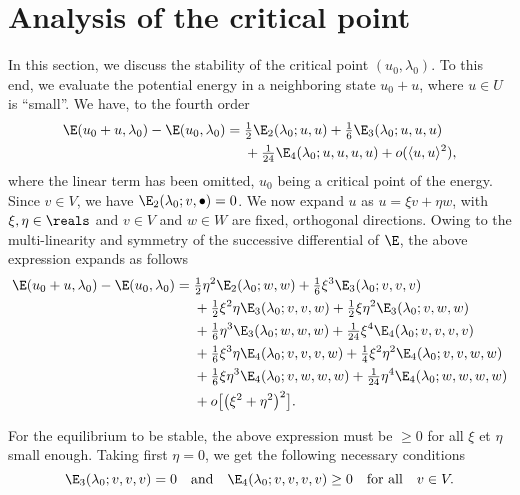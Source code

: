 \section{Analysis of the critical point}
\label{sec:20220802061621}

In this section, we discuss the stability of the critical point $(u_0, \lambda_0)$. To this end, we evaluate the
potential energy in a neighboring state $u_0 + u$, where $u \in U$ is ``small''. We have, to the fourth order
\begin{equation}
  \begin{aligned}[b]
    \E(u_0 + u, \lambda_0) - \E(u_0, \lambda_0) ={}
    &\tfrac{1}{2} \E_2(\lambda_0; u, u) + \tfrac{1}{6} \E_3(\lambda_0; u, u, u)\\
    &+ \tfrac{1}{24} \E_4(\lambda_0; u, u, u, u) + o(\langle u , u \rangle^2),
  \end{aligned}
\end{equation}
where the linear term has been omitted, $u_0$ being a critical point of the energy. Since $v \in V$, we have
$\E_2(\lambda_0; v, \bullet) = 0$. We now expand $u$ as $u = \xi v + \eta w$, with $\xi, \eta \in \reals$ and $v \in V$
and $w \in W$ are fixed, orthogonal directions. Owing to the multi-linearity and symmetry of the successive differential
of $\E$, the above expression expands as follows
\begin{equation}
  \begin{aligned}[b]
    \E(u_0 + u, \lambda_0) - \E(u_0, \lambda_0) ={}
    & \tfrac{1}{2} \eta^2 \E_2(\lambda_0; w, w) + \tfrac{1}{6} \xi^3 \E_3(\lambda_0; v, v, v)\\
    & + \tfrac{1}{2} \xi^2 \eta \E_3(\lambda_0; v, v, w) + \tfrac{1}{2} \xi \eta^2 \E_3(\lambda_0; v, w, w)\\
    & + \tfrac{1}{6} \eta^3 \E_3(\lambda_0; w, w, w) + \tfrac{1}{24} \xi^4 \E_4(\lambda_0; v, v, v, v)\\
    & + \tfrac{1}{6} \xi^3 \eta \E_4(\lambda_0; v, v, v, w) + \tfrac{1}{4} \xi^2 \eta^2 \E_4(\lambda_0; v, v, w, w)\\
    & + \tfrac{1}{6} \xi \eta^3 \E_4(\lambda_0; v, w, w, w) + \tfrac{1}{24} \eta^4 \E_4(\lambda_0; w, w, w, w)\\
    & + o\bigl[\bigl(\xi^2 + \eta^2\bigr)^2\bigr].
  \end{aligned}
\end{equation}

For the equilibrium to be stable, the above expression must be $\geq 0$ for all $\xi$ et $\eta$ small enough. Taking
first $\eta = 0$, we get the following necessary conditions
\begin{equation}
  \label{eq:20211108164416}
  \E_3(\lambda_0; v, v, v) = 0 \quad \text{and} \quad \E_4(\lambda_0; v, v, v, v) \geq 0 \quad \text{for all} \quad v \in V.
\end{equation}

